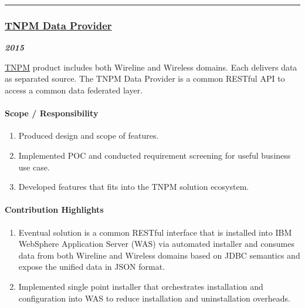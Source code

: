 \documentclass[
]{article}
\providecommand{\tightlist}{%
  \setlength{\itemsep}{0pt}\setlength{\parskip}{0pt}}
\begin{document}
\begin{center}\rule{0.5\linewidth}{0.5pt}\end{center}

\hypertarget{tnpm-data-provider}{%
\subsubsection{\texorpdfstring{\href{https://www-304.ibm.com/software/brandcatalog/ismlibrary/details?catalog.label=1TW10NP6I}{TNPM
Data Provider}}{TNPM Data Provider}}\label{tnpm-data-provider}}

\textbf{\emph{2015}}

\href{https://www.ibm.com/support/knowledgecenter/SSBNJ7_1.4.0/com.ibm.tnpm_1.4_kc.doc/quick_start/tnpm_1.4_quick_start_guide.html}{TNPM}
product includes both Wireline and Wireless domains. Each delivers data
as separated source. The TNPM Data Provider is a common RESTful API to
access a common data federated layer.

\hypertarget{scope-responsibility-10}{%
\paragraph{Scope / Responsibility}\label{scope-responsibility-10}}

\begin{enumerate}
\def\labelenumi{\arabic{enumi}.}
\tightlist
\item
  Produced design and scope of features.
\item
  Implemented POC and conducted requirement screening for useful
  business use case.
\item
  Developed features that fits into the TNPM solution ecosystem.
\end{enumerate}

\hypertarget{contribution-highlights-10}{%
\paragraph{Contribution Highlights}\label{contribution-highlights-10}}

\begin{enumerate}
\def\labelenumi{\arabic{enumi}.}
\tightlist
\item
  Eventual solution is a common RESTful interface that is installed into
  IBM WebSphere Application Server (WAS) via automated installer and
  consumes data from both Wireline and Wireless domains based on JDBC
  semantics and expose the unified data in JSON format.
\item
  Implemented single point installer that orchestrates installation and
  configuration into WAS to reduce installation and uninstallation
  overheads.
\end{enumerate}
\end{document}
